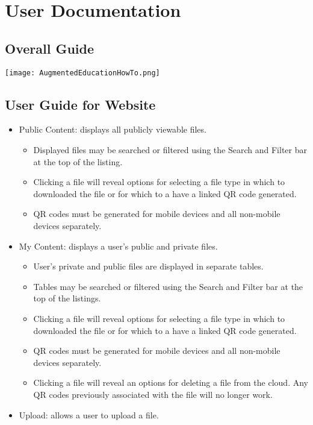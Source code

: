 
\chapter{User Documentation}

\section{Overall Guide}
\texttt{[image: AugmentedEducationHowTo.png]}

\section{User Guide for Website}
\begin{itemize}
    \item Public Content: displays all publicly viewable files.
    \begin{itemize}
        \item Displayed files may be searched or filtered using the Search and Filter bar at the top of the listing.
        \item Clicking a file will reveal options for selecting a file type in which to downloaded the file or for which to a have a linked QR code generated.
        \item QR codes must be generated for mobile devices and all non-mobile devices separately. 
    \end{itemize}
    \item My Content: displays a user's public and private files.
    \begin{itemize}
        \item User's private and public files are displayed in separate tables.  
        \item Tables may be searched or filtered using the Search and Filter bar at the top of the listings.
        \item Clicking a file will reveal options for selecting a file type in which to downloaded the file or for which to a have a linked QR code generated.
        \item QR codes must be generated for mobile devices and all non-mobile devices separately. 
        \item Clicking a file will reveal an options for deleting a file from the cloud. Any QR codes previously associated with the file will no longer work. 
    \end{itemize}
    \item Upload: allows a user to upload a file.

\end{itemize}
